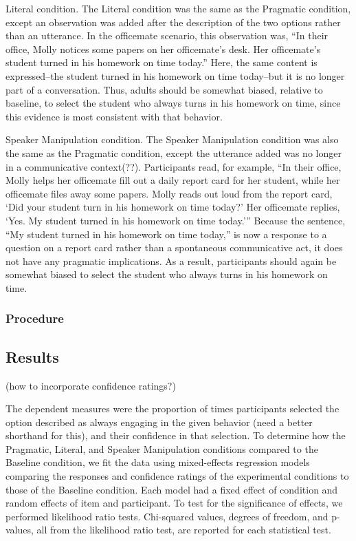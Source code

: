 \documentclass[10pt,letterpaper]{article}
\begin{document}
Literal condition. The Literal condition was the same as the Pragmatic condition, except an observation was added after the description of the two options rather than an utterance.  In the officemate scenario, this observation was, “In their office, Molly notices some papers on her officemate's desk. Her officemate's student turned in his homework on time today.”  Here, the same content is expressed--the student turned in his homework on time today--but it is no longer part of a conversation.  Thus, adults should be somewhat biased, relative to baseline, to select the student who always turns in his homework on time, since this evidence is most consistent with that behavior.

Speaker Manipulation condition.  The Speaker Manipulation condition was also the same as the Pragmatic condition, except the utterance added was no longer in a communicative context(??).  Participants read, for example, “In their office, Molly helps her officemate fill out a daily report card for her student, while her officemate files away some papers.  Molly reads out loud from the report card, ‘Did your student turn in his homework on time today?’  Her officemate replies, ‘Yes. My student turned in his homework on time today.’”  Because the sentence, “My student turned in his homework on time today,” is now a response to a question on a report card rather than a spontaneous communicative act, it does not have any pragmatic implications.  As a result, participants should again be somewhat biased to select the student who always turns in his homework on time.

\subsubsection{Procedure}

\subsection{Results}

(how to incorporate confidence ratings?)

The dependent measures were the proportion of times participants selected the option described as always engaging in the given behavior (need a better shorthand for this), and their confidence in that selection.  To determine how the Pragmatic, Literal, and Speaker Manipulation conditions compared to the Baseline condition, we fit the data using mixed-effects regression models comparing the responses and confidence ratings of the experimental conditions to those of the Baseline condition.  Each model had a fixed effect of condition and random effects of item and participant.  To test for the significance of effects, we performed likelihood ratio tests. Chi-squared values, degrees of freedom, and p-values, all from the likelihood ratio test, are reported for each statistical test.
\end{document}
